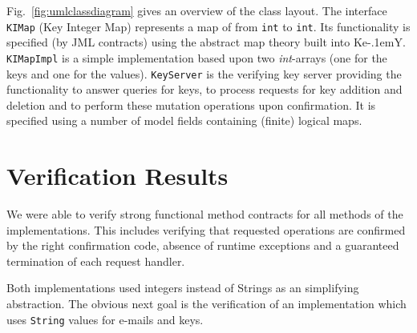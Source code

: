 \documentclass{llncs}
\newcommand{\KeY}{Ke\kern-.1emY\xspace}
\begin{document}
Fig.~\ref{fig:umlclassdiagram} gives an overview of the class layout.
%
The interface \texttt{KIMap} (Key Integer Map) represents a map of
from \texttt{int} to \texttt{int}. Its functionality is specified (by
JML contracts) using the abstract map theory built into
\KeY. \texttt{KIMapImpl} is a simple implementation based upon two
\emph{int}-arrays (one for the keys and one for the values).
%
\texttt{KeyServer} is the verifying key server
providing the functionality to answer queries for keys, to process
requests for key addition and deletion and to perform these
mutation operations upon confirmation. It is specified using a
number of model fields containing (finite) logical maps.
%

\section{Verification Results}

We were able to verify strong functional method contracts for all
methods of the implementations. This includes verifying that requested
operations are confirmed by the right confirmation code,
absence of runtime
exceptions and a guaranteed termination of each request handler.



Both implementations used integers instead of Strings as an
simplifying abstraction.
%
The obvious next goal is the verification of an implementation which
uses \texttt{String} values for e-mails and keys.
%
%



\end{document}
